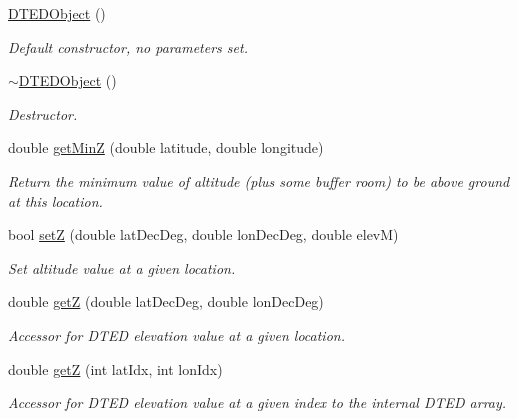 \begin{DoxyCompactItemize}
\item 
\hyperlink{class_d_t_e_d_object_a94b6a1f803201182e5debf32179f1566}{DTEDObject} ()
\begin{DoxyCompactList}\small\item\em Default constructor, no parameters set. \end{DoxyCompactList}\item 
\hypertarget{class_d_t_e_d_object_a23cdb3326b5945de71523f6e422653d2}{
\hyperlink{class_d_t_e_d_object_a23cdb3326b5945de71523f6e422653d2}{$\sim$DTEDObject} ()}
\label{class_d_t_e_d_object_a23cdb3326b5945de71523f6e422653d2}

\begin{DoxyCompactList}\small\item\em Destructor. \end{DoxyCompactList}\item 
double \hyperlink{class_d_t_e_d_object_a07b55972135146b6c6a423c547362285}{getMinZ} (double latitude, double longitude)
\begin{DoxyCompactList}\small\item\em Return the minimum value of altitude (plus some buffer room) to be above ground at this location. \end{DoxyCompactList}\item 
bool \hyperlink{class_d_t_e_d_object_adeb1f9b5246620509195d5855415b4aa}{setZ} (double latDecDeg, double lonDecDeg, double elevM)
\begin{DoxyCompactList}\small\item\em Set altitude value at a given location. \end{DoxyCompactList}\item 
double \hyperlink{class_d_t_e_d_object_a3f4b010704450faff09e2f3de1a5e28a}{getZ} (double latDecDeg, double lonDecDeg)
\begin{DoxyCompactList}\small\item\em Accessor for DTED elevation value at a given location. \end{DoxyCompactList}\item 
double \hyperlink{class_d_t_e_d_object_af148f810e6defb01360fdaafdca8daff}{getZ} (int latIdx, int lonIdx)
\begin{DoxyCompactList}\small\item\em Accessor for DTED elevation value at a given index to the internal DTED array. \end{DoxyCompactList}\end{DoxyCompactItemize}

